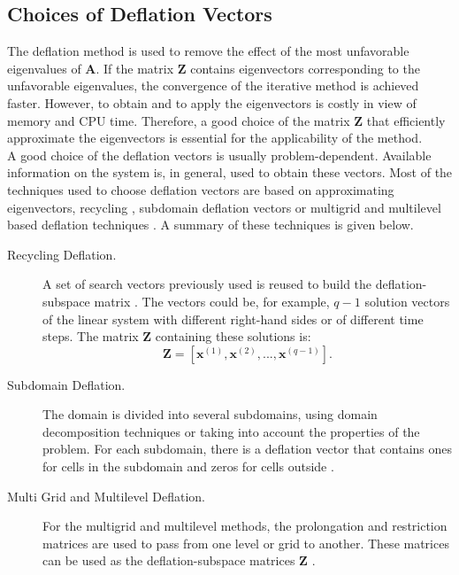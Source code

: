 \documentclass[review]{elsarticle}
\begin{document}
\subsection{Choices of Deflation Vectors}
The deflation method is used to remove the effect of the most unfavorable eigenvalues
of $\mathbf{A}$. If the matrix $\mathbf{Z}$ contains eigenvectors corresponding to the unfavorable 
eigenvalues, the convergence of the 
iterative method is achieved faster. However, to obtain and to apply the eigenvectors is costly in view of memory and CPU time.
Therefore, a good choice of the matrix $\mathbf{Z}$ that efficiently approximate the eigenvectors is essential
for the applicability of the method.\\
A good choice of the deflation vectors is usually problem-dependent. Available information on the system is, in general,
used to obtain these vectors.
Most of the techniques used to choose deflation vectors are based on approximating eigenvectors, 
recycling \cite{Clemens04}, subdomain deflation vectors \cite{Vuik02} or multigrid and 
multilevel based deflation techniques \cite{Tang09,Smith96}. A summary of these techniques is given below.
\begin{description}
 \item [Recycling Deflation.] A set of search vectors previously used is reused to build the deflation-subspace 
 matrix \cite{Clemens04}. 
The vectors could be, for example, $q-1$
solution vectors of the linear system with different right-hand sides or of different time steps.
The matrix $\mathbf{Z}$ containing these solutions is:
$$\mathbf{Z}=[\mathbf{x}^{(1)},\mathbf{x}^{(2)},...,\mathbf{x}^{(q-1)}].$$
 \item [Subdomain Deflation.] The domain is divided into several subdomains,
 using domain decomposition techniques or taking into account the properties of the problem.
For each subdomain, there is a deflation vector that contains ones for cells in the 
subdomain and zeros for cells outside \cite{Vuik02}.
 \item [Multi Grid and Multilevel Deflation.] For the multigrid and multilevel methods, 
 the prolongation and restriction matrices are used to pass from one level or grid to another. 
These matrices can be used as the deflation-subspace matrices $\mathbf{Z}$ \cite{Tang09}.
\end{description}
\newpage
\end{document}

